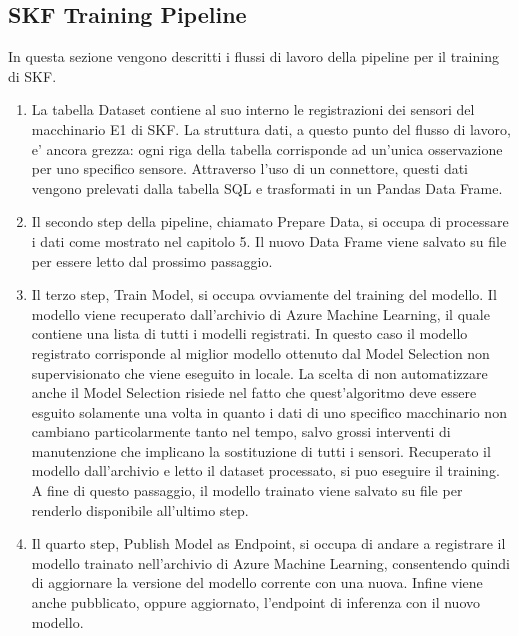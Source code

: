 \subsection{SKF Training Pipeline}
In questa sezione vengono descritti i flussi di lavoro della pipeline per il training di SKF.
\begin{enumerate}
\item La tabella Dataset contiene al suo interno le registrazioni dei sensori del macchinario E1 di SKF. La struttura dati, a questo punto del flusso di lavoro, e' ancora grezza: ogni riga della tabella corrisponde ad un'unica osservazione per uno specifico sensore. Attraverso l'uso di un connettore, questi dati vengono prelevati dalla tabella SQL e trasformati in un Pandas Data Frame.
\item Il secondo step della pipeline, chiamato Prepare Data, si occupa di processare i dati come mostrato nel capitolo 5. Il nuovo Data Frame viene salvato su file per essere letto dal prossimo passaggio.
\item Il terzo step, Train Model, si occupa ovviamente del training del modello. Il modello viene recuperato dall'archivio di Azure Machine Learning, il quale contiene una lista di tutti i modelli registrati. In questo caso il modello registrato corrisponde al miglior modello ottenuto dal Model Selection non supervisionato che viene eseguito in locale. La scelta di non automatizzare anche il Model Selection risiede nel fatto che quest'algoritmo deve essere esguito solamente una volta in quanto i dati di uno specifico macchinario non cambiano particolarmente tanto nel tempo, salvo grossi interventi di manutenzione che implicano la sostituzione di tutti i sensori. Recuperato il modello dall'archivio e letto il dataset processato, si puo eseguire il training. A fine di questo passaggio, il modello trainato viene salvato su file per renderlo disponibile all'ultimo step.
\item Il quarto step, Publish Model as Endpoint, si occupa di andare a registrare il modello trainato nell'archivio di Azure Machine Learning, consentendo quindi di aggiornare la versione del modello corrente con una nuova. Infine viene anche pubblicato, oppure aggiornato, l'endpoint di inferenza con il nuovo modello.
\end{enumerate}


